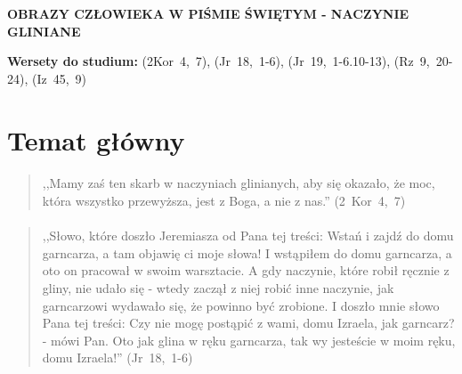 \documentclass[10pt,a4paper,oneside]{article}
\begin{document}
\centerline{\textbf{\MakeUppercase{Obrazy człowieka w Piśmie Świętym - naczynie gliniane}}}
\begin{center}
\textbf{Wersety do studium:} \mbox{(2Kor 4, 7)}, \mbox{(Jr 18, 1-6)}, \mbox{(Jr 19, 1-6.10-13)}, \mbox{(Rz 9, 20-24)}, \mbox{(Iz 45, 9)}
\end{center}
\section{Temat główny}
\paragraph{}
\begin{quote}
,,Mamy zaś ten skarb w naczyniach glinianych, aby się okazało, że moc, która wszystko przewyższa, jest z Boga, a nie z nas.'' \mbox{(2 Kor 4, 7)}
\end{quote}
\paragraph{}
\begin{quote}
,,Słowo, które doszło Jeremiasza od Pana tej treści: Wstań i zajdź do domu garncarza, a tam objawię ci moje słowa! I wstąpiłem do domu garncarza, a oto on pracował w swoim warsztacie. A gdy naczynie, które robił ręcznie z gliny, nie udało się - wtedy zaczął z niej robić inne naczynie, jak garncarzowi wydawało się, że powinno być zrobione. I doszło mnie słowo Pana tej treści: Czy nie mogę postąpić z wami, domu Izraela, jak garncarz? - mówi Pan. Oto jak glina w ręku garncarza, tak wy jesteście w moim ręku, domu Izraela!'' \mbox{(Jr 18, 1-6)}
\end{quote}
\end{document}
